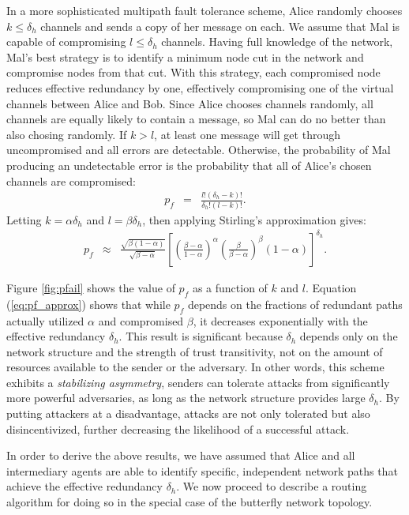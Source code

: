 \documentclass{sig-alternate-05-2015}
\newcommand{\beq}{\begin{eqnarray}}
\newcommand{\eeq}{\end{eqnarray}}
\begin{document}
In a more sophisticated multipath fault tolerance scheme,
Alice randomly chooses $k \leq \delta_h$ channels and sends a copy of
her message on each.
We assume that Mal is capable of compromising $l \leq \delta_h$ channels.
Having full knowledge of the network,
Mal's best strategy is to identify a minimum node cut in the network
and compromise nodes from that cut.
With this strategy, each compromised node reduces effective redundancy by one,
effectively compromising one of the virtual channels between Alice and Bob.
Since Alice chooses channels randomly,
all channels are equally likely to contain a message,
so Mal can do no better than also chosing randomly.
If $k > l$, at least one message will get through uncompromised and all
errors are detectable.
Otherwise, the probability of Mal producing an undetectable error is
the probability that all of Alice's chosen channels are compromised:
\beq
\label{eq:pf}
p_f &=& \frac{l!(\delta_h-k)!}{\delta_h!(l-k)!}.
\eeq
Letting $k=\alpha \delta_h$ and $l=\beta \delta_h$, then applying Stirling's
approximation gives:
\begin{eqnarray}
\label{eq:pf_approx}
p_f &\approx&
\frac{\sqrt{\beta(1-\alpha)}}{\sqrt{\beta-\alpha}}
\left[
    \left( \frac{\beta-\alpha}{1-\alpha} \right)^{\alpha}
    \left( \frac{\beta}{\beta-\alpha} \right)^{\beta}
    (1-\alpha)
\right]^{\delta_h}.
\end{eqnarray}

Figure \ref{fig:pfail} shows the value of $p_f$
as a function of $k$ and $l$.
Equation (\ref{eq:pf_approx}) shows that while $p_f$
depends on the fractions of
redundant paths actually utilized $\alpha$ and compromised $\beta$,
it decreases exponentially with the effective redundancy $\delta_h$.
This result is significant because $\delta_h$
depends only on the network structure
and the strength of trust transitivity,
not on the amount of resources available to the sender or the adversary.
In other words, this scheme exhibits a {\em stabilizing asymmetry},
senders can tolerate attacks from significantly more powerful
adversaries, as long as the network structure provides large $\delta_h$.
By putting attackers at a disadvantage, attacks are not only tolerated
but also disincentivized,
further decreasing the likelihood of a successful attack.

In order to derive the above results, we have assumed that Alice and all
intermediary agents are able to identify specific,
independent network paths that achieve the effective redundancy $\delta_h$.
We now proceed to describe a routing algorithm for doing so in the special case
of the butterfly network topology.
\end{document}
